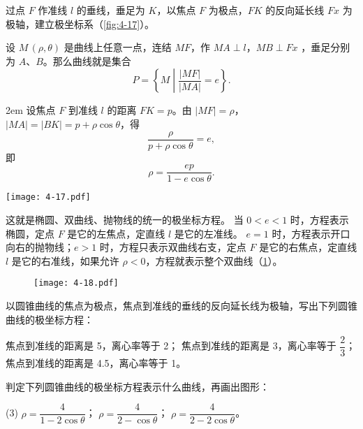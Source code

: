 过点 $F$ 作准线 $l$ 的垂线，垂足为 $K$，以焦点 $F$ 为极点，$FK$ 的反向延长线 $Fx$ 为极轴，建立极坐标系（\cref{fig:4-17}）。

设 $M\,(\rho,\theta)$ 是曲线上任意一点，连结 $MF$，作 $MA \perp l$，$MB \perp Fx$ ，垂足分别为 $A$、$B$。那么曲线就是集合
\[P=\left\{M \middle\vert \frac{|MF|}{|MA|}=e \right\}.\]

\medskip\noindent
\begin{minipage}{0.65\linewidth}\parindent2em
  设焦点 $F$ 到准线 $l$ 的距离 $FK=p$。由 $|MF|=\rho$，$|MA|=|BK|=p+\rho\cos\theta$，得
  \[\frac{\rho}{p+\rho\cos\theta}=e,\]
  即
  \[\rho=\frac{ep}{1-e\cos\theta}.\]
\end{minipage}\hfill
\begin{minipage}{0.3\linewidth}
  \begin{figurehere}
    \texttt{[image: 4-17.pdf]}
    \caption{}\label{fig:4-17}
  \end{figurehere}
\end{minipage}

\medskip
这就是椭圆、双曲线、抛物线的统一的极坐标方程。
当 $0<e<1$ 时，方程表示椭圆，定点 $F$ 是它的左焦点，定直线 $l$ 是它的左准线。
$e=1$ 时，方程表示开口向右的抛物线；$e>1$ 时，方程只表示双曲线右支，定点 $F$ 是它的右焦点，定直线 $l$ 是它的右准线，如果允许 $\rho< 0$，方程就表示整个双曲线（\cref{fig:4-18}）。
\begin{figure}
  \texttt{[image: 4-18.pdf]}
  \caption{}\label{fig:4-18}
\end{figure}

\begin{Practice}
  \begin{question}
    \item 以圆锥曲线的焦点为极点，焦点到准线的垂线的反向延长线为极轴，写出下列圆锥曲线的极坐标方程：
    \begin{tasks}
      \task 焦点到准线的距离是 5，离心率等于 2；
      \task 焦点到准线的距离是 3，离心率等于 $\dfrac{2}{3}$；
      \task 焦点到准线的距离是 4.5，离心率等于 1。
    \end{tasks}
    \item 判定下列圆锥曲线的极坐标方程表示什么曲线，再画出图形：
    \begin{tasks}(3)
      \task $\rho=\dfrac{4}{1-2\cos\theta}$；
      \task $\rho=\dfrac{4}{2-\cos\theta}$；
      \task $\rho=\dfrac{4}{2-2\cos\theta}$。
    \end{tasks}
  \end{question}
\end{Practice}

